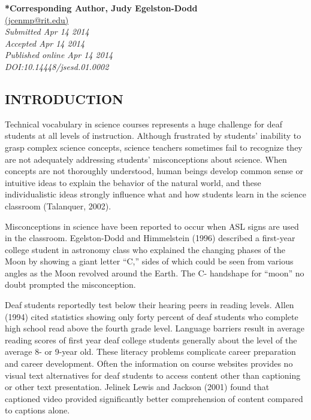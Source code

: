 \documentclass[11.5pt]{sig-alternate} %
\begin{document}
\textbf{*Corresponding Author, Judy Egelston-Dodd}\\
\href{mailto:jcenmp@rit.edu}{(jcenmp@rit.edu)} \\
\textit{Submitted  Apr 14 2014}\\
\textit{Accepted Apr 14 2014} \\
\textit{Published online Apr 14 2014} \\
\textit{DOI:10.14448/jsesd.01.0002} \\
\pagebreak
\clearpage
\begin{large}
\section*{INTRODUCTION}
Technical vocabulary in science courses represents a huge challenge for deaf students at all levels of instruction.  Although frustrated by students’ inability to grasp complex science concepts, science teachers sometimes fail to recognize they are not adequately addressing students’ misconceptions about science.  When concepts are not thoroughly understood, human beings develop common sense or intuitive ideas to explain the behavior of the natural world, and these individualistic ideas strongly influence what and how students learn in the science classroom (Talanquer, 2002). 
 
Misconceptions in science have been reported to occur when ASL signs are used in the classroom.  Egelston-Dodd and Himmelstein (1996) described a first-year college student in astronomy class who explained the changing phases of the Moon by showing a giant letter “C,” sides of which could be seen from various angles as the Moon revolved around the Earth.  The C- handshape for “moon” no doubt prompted the misconception. 
 
Deaf students reportedly test below their hearing peers in reading levels.  Allen (1994) cited statistics showing only forty percent of deaf students who complete high school read above the fourth grade level.  Language barriers result in average reading scores of first year deaf college students generally about the level of the average 8- or 9-year old.  These literacy problems complicate career preparation and career development.  Often the information on course websites provides no visual text alternatives for deaf students to access content other than captioning or other text presentation.  Jelinek Lewis and Jackson (2001) found that captioned video provided significantly better comprehension of content compared to captions alone. 
 

\end{large}
\end{document}

